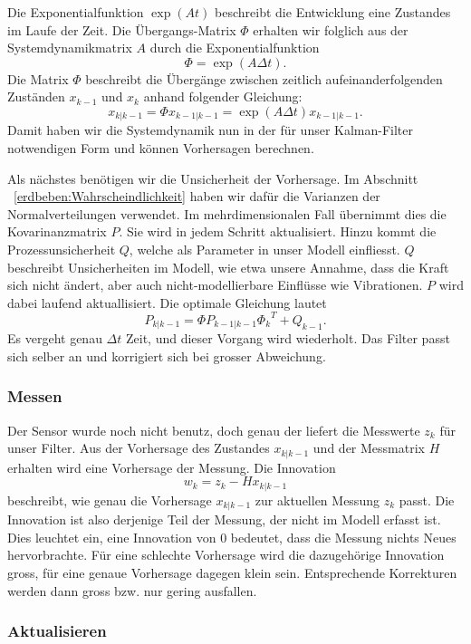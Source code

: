 Die Exponentialfunktion $\exp(At)$ beschreibt die Entwicklung eine Zustandes im Laufe der Zeit.
Die Übergangs-Matrix $\Phi$ erhalten wir folglich aus der Systemdynamikmatrix $A$ durch die Exponentialfunktion
\[\Phi = \exp(A\Delta t). \]
Die Matrix $\Phi$ beschreibt die Übergänge zwischen zeitlich aufeinanderfolgenden Zuständen $x_{k-1}$ und $x_{k}$ anhand folgender Gleichung:
\[
{x_{k|k-1}}=\Phi{x_{k-1|k-1}}= \exp(A\Delta t){x_{k-1|k-1}}.
\] 
Damit haben wir die Systemdynamik nun in der für unser Kalman-Filter notwendigen Form und können Vorhersagen berechnen.

Als nächstes benötigen wir die Unsicherheit der Vorhersage.
Im Abschnitt ~\ref{erdbeben:Wahrscheindlichkeit} haben wir dafür die Varianzen der Normalverteilungen verwendet.
Im mehrdimensionalen Fall übernimmt dies die Kovarinanzmatrix $P$.
Sie wird in jedem Schritt aktualisiert.
Hinzu kommt die Prozessunsicherheit $Q$, welche als Parameter in unser Modell einfliesst.
$Q$ beschreibt Unsicherheiten im Modell,
wie etwa unsere Annahme, dass die Kraft sich nicht ändert,
aber auch nicht-modellierbare Einflüsse wie Vibrationen.
$P$ wird dabei laufend aktuallisiert.
Die optimale Gleichung lautet
\[
{P_{k|k-1}}=\Phi {P_{k-1|k-1}} {\Phi _{k}}^T + {Q_{k-1}}.
\] 
Es vergeht genau $\Delta t$ Zeit, und dieser Vorgang wird wiederholt.  
Das Filter passt sich selber an und korrigiert sich bei grosser Abweichung.

\subsubsection*{Messen}
Der Sensor wurde noch nicht benutz, doch genau der liefert die Messwerte $z_k$ für unser Filter. 
Aus der Vorhersage des Zustandes $x_{k|k-1}$ und der Messmatrix $H$ erhalten wird eine Vorhersage der Messung. 
Die Innovation
\[
{w_{k}}={z_{k}}-{H}{x_{k|k-1}}
\] 
beschreibt, wie genau die Vorhersage $x_{k|k-1}$ zur aktuellen Messung $z_k$ passt. 
Die Innovation ist also derjenige Teil der Messung, der nicht im Modell erfasst ist.
Dies leuchtet ein, eine Innovation von $0$ bedeutet, dass die Messung nichts Neues hervorbrachte.
Für eine schlechte Vorhersage wird die dazugehörige Innovation gross, für eine genaue Vorhersage dagegen klein sein. 
Entsprechende Korrekturen werden dann gross bzw. nur gering ausfallen. 

\subsubsection*{Aktualisieren}

